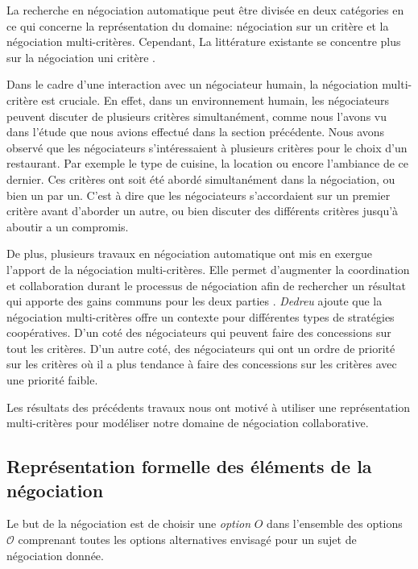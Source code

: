 	
		La recherche en négociation automatique peut être divisée en deux catégories en ce qui concerne la représentation du domaine: négociation sur un critère et la négociation multi-critères. Cependant, La littérature existante se concentre plus sur la négociation uni critère \cite{lai2008decentralized,lai2004literature}. 
		
		Dans le cadre d'une interaction avec un négociateur humain, la négociation multi-critère est cruciale. En effet, dans un environnement humain, les négociateurs peuvent discuter de plusieurs critères simultanément, comme nous l'avons vu dans l'étude que nous avions effectué dans la section précédente.  Nous avons observé que les négociateurs s'intéressaient à plusieurs critères pour le choix d'un restaurant. Par exemple le type de cuisine, la location ou encore l'ambiance de ce dernier. Ces critères ont soit été abordé simultanément dans la négociation, ou bien un par un. C'est à dire que les négociateurs s'accordaient sur un premier critère avant d'aborder un autre, ou bien discuter des différents critères jusqu'à aboutir a un compromis.
		
		De plus, plusieurs travaux en négociation automatique ont mis en exergue l'apport de la négociation multi-critères. Elle permet d'augmenter la coordination et collaboration durant le processus de négociation afin de rechercher un résultat qui apporte des gains communs pour les deux parties \cite{jonker2007agent,lai2008decentralized,lai2004literature}. \emph{Dedreu} ajoute que la négociation multi-critères offre un contexte pour différentes types de stratégies coopératives. D'un coté des négociateurs qui peuvent faire des concessions sur tout les critères. D'un autre coté, des négociateurs qui ont un ordre de priorité sur les critères où il a plus tendance à faire des concessions sur les critères avec une priorité faible. 
	
		Les résultats des précédents travaux nous ont motivé à utiliser une représentation multi-critères pour modéliser notre domaine de négociation collaborative. 
		
		\subsection{Représentation formelle des éléments de la négociation}	
		Le but de la négociation est de choisir une \textit{option} $O$ dans l'ensemble des options $\mathcal{O}$ comprenant toutes les options alternatives envisagé pour un sujet de négociation donnée. 
		
